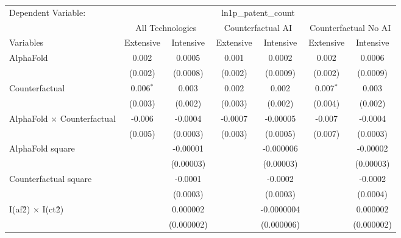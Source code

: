 \begingroup
\centering
\begin{tabular}{lcccccc}
   \tabularnewline \midrule \midrule
   Dependent Variable: & \multicolumn{6}{c}{ln1p\_patent\_count}\\
 & \multicolumn{2}{c}{All Technologies} & \multicolumn{2}{c}{Counterfactual AI} & \multicolumn{2}{c}{Counterfactual No AI} \\
\cmidrule(lr){1-1}\cmidrule(lr){2-3} \cmidrule(lr){4-5} \cmidrule(lr){6-7}
Variables & \multicolumn{1}{c}{Extensive} & \multicolumn{1}{c}{Intensive} & \multicolumn{1}{c}{Extensive} & \multicolumn{1}{c}{Intensive} & \multicolumn{1}{c}{Extensive} & \multicolumn{1}{c}{Intensive} \\
\cmidrule(lr){1-1}\cmidrule(lr){2-2} \cmidrule(lr){3-3} \cmidrule(lr){4-4} \cmidrule(lr){5-5} \cmidrule(lr){6-6} \cmidrule(lr){7-7}
   AlphaFold                          & 0.002       & 0.0005     & 0.001   & 0.0002     & 0.002       & 0.0006\\   
                                      & (0.002)     & (0.0008)   & (0.002) & (0.0009)   & (0.002)     & (0.0009)\\   
   Counterfactual                     & 0.006$^{*}$ & 0.003      & 0.002   & 0.002      & 0.007$^{*}$ & 0.003\\   
                                      & (0.003)     & (0.002)    & (0.003) & (0.002)    & (0.004)     & (0.002)\\   
   AlphaFold $\times$ Counterfactual  & -0.006      & -0.0004    & -0.0007 & -0.00005   & -0.007      & -0.0004\\   
                                      & (0.005)     & (0.0003)   & (0.003) & (0.0005)   & (0.007)     & (0.0003)\\   
   AlphaFold square                   &             & -0.00001   &         & -0.000006  &             & -0.00002\\   
                                      &             & (0.00003)  &         & (0.00003)  &             & (0.00003)\\   
   Counterfactual square              &             & -0.0001    &         & -0.0002    &             & -0.0002\\   
                                      &             & (0.0003)   &         & (0.0003)   &             & (0.0004)\\   
   I(af\^2) $\times$ I(ct\^2)         &             & 0.000002   &         & -0.0000004 &             & 0.000002\\   
                                      &             & (0.000002) &         & (0.000006) &             & (0.000002)\\   

\end{tabular}
